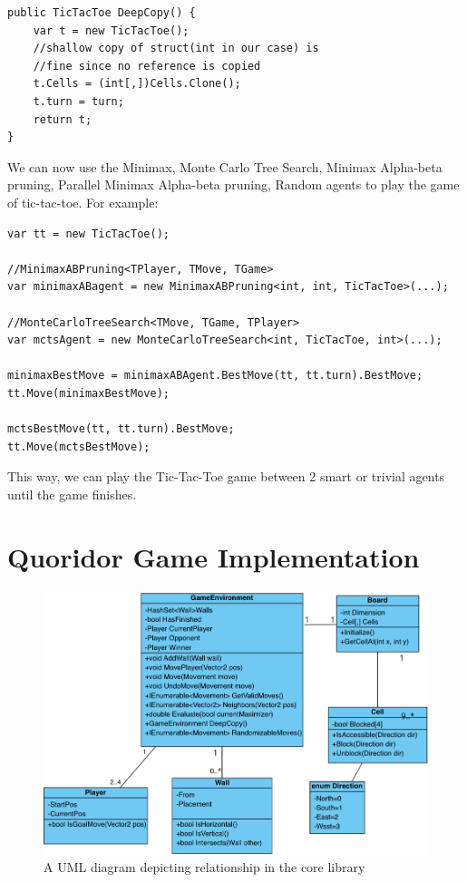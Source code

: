 \begin{lstlisting}
public TicTacToe DeepCopy() {
    var t = new TicTacToe();
    //shallow copy of struct(int in our case) is
    //fine since no reference is copied
    t.Cells = (int[,])Cells.Clone();
    t.turn = turn;
    return t;
}
\end{lstlisting}

We can now use the Minimax, Monte Carlo Tree Search, Minimax Alpha-beta pruning, Parallel Minimax Alpha-beta pruning, Random agents to play the game of tic-tac-toe. For example:

\begin{lstlisting}
var tt = new TicTacToe();

//MinimaxABPruning<TPlayer, TMove, TGame>
var minimaxABagent = new MinimaxABPruning<int, int, TicTacToe>(...);

//MonteCarloTreeSearch<TMove, TGame, TPlayer>
var mctsAgent = new MonteCarloTreeSearch<int, TicTacToe, int>(...);

minimaxBestMove = minimaxABAgent.BestMove(tt, tt.turn).BestMove;
tt.Move(minimaxBestMove);

mctsBestMove(tt, tt.turn).BestMove;
tt.Move(mctsBestMove);
\end{lstlisting}

This way, we can play the Tic-Tac-Toe game between 2 smart or trivial agents until the game finishes.

\section{Quoridor Game Implementation}

\begin{figure}[!ht]
    \centering
    \includegraphics[width=.95\linewidth]{../img/uml_core.png}
    \caption{A UML diagram depicting relationship in the core library}
    \label{fig:core_uml}
\end{figure}

